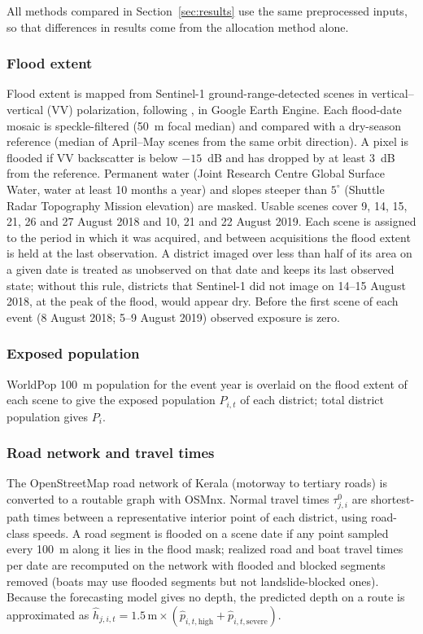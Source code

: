 \documentclass[pdflatex,sn-basic]{sn-jnl}
\theoremstyle{plain}%
\theoremstyle{remark}%
\theoremstyle{definition}%
\begin{document}
All methods compared in Section~\ref{sec:results} use the same preprocessed inputs, so that differences in results come from the allocation method alone.

\subsubsection{Flood extent}
 Flood extent is mapped from Sentinel-1 ground-range-detected scenes in vertical--vertical (VV) polarization, following \citet{Tiwari2020}, in Google Earth Engine. Each flood-date mosaic is speckle-filtered (50~m focal median) and compared with a dry-season reference (median of April--May scenes from the same orbit direction). A pixel is flooded if VV backscatter is below $-15$~dB and has dropped by at least 3~dB from the reference. Permanent water (Joint Research Centre Global Surface Water, water at least 10 months a year) and slopes steeper than $5^{\circ}$ (Shuttle Radar Topography Mission elevation) are masked. Usable scenes cover 9, 14, 15, 21, 26 and 27 August 2018 and 10, 21 and 22 August 2019. Each scene is assigned to the period in which it was acquired, and between acquisitions the flood extent is held at the last observation. A district imaged over less than half of its area on a given date is treated as unobserved on that date and keeps its last observed state; without this rule, districts that Sentinel-1 did not image on 14--15 August 2018, at the peak of the flood, would appear dry. Before the first scene of each event (8 August 2018; 5--9 August 2019) observed exposure is zero.

\subsubsection{Exposed population}
 WorldPop 100~m population for the event year \citep{WorldPop} is overlaid on the flood extent of each scene to give the exposed population $P_{i,t}$ of each district; total district population gives $P_i$.

\subsubsection{Road network and travel times}
 The OpenStreetMap road network \citep{OSM} of Kerala (motorway to tertiary roads) is converted to a routable graph with OSMnx. Normal travel times $\tau^0_{j,i}$ are shortest-path times between a representative interior point of each district, using road-class speeds. A road segment is flooded on a scene date if any point sampled every 100~m along it lies in the flood mask; realized road and boat travel times per date are recomputed on the network with flooded and blocked segments removed (boats may use flooded segments but not landslide-blocked ones). Because the forecasting model gives no depth, the predicted depth on a route is approximated as $\hat h_{j,i,t} = 1.5\,\text{m} \times (\hat p_{i,t,\text{high}} + \hat p_{i,t,\text{severe}})$.
\end{document}
